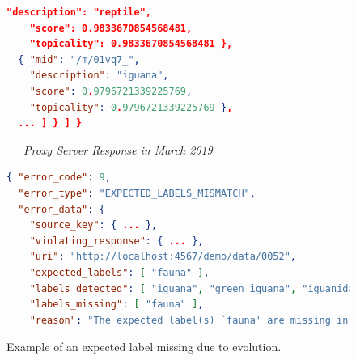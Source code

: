 \begin{figure}
\begin{framed}
\begin{minipage}{\linewidth}
\begin{lstlisting}[language=json]
    "description": "reptile",
    "score": 0.9833670854568481,
    "topicality": 0.9833670854568481 },
  { "mid": "/m/01vq7_",
    "description": "iguana",
    "score": 0.9796721339225769,
    "topicality": 0.9796721339225769 },
  ... ] } ] }
        \end{lstlisting}
    \end{minipage}
    \begin{minipage}{\linewidth}
        \noindent\xrfill[0.45ex]{.5pt}~~~\textit{Proxy Server Response in March 2019}~~~\xrfill[0.45ex]{.5pt}
        \begin{lstlisting}[language=json]
{ "error_code": 9,
  "error_type": "EXPECTED_LABELS_MISMATCH",
  "error_data": {
    "source_key": { ... },
    "violating_response": { ... },
    "uri": "http://localhost:4567/demo/data/0052",
    "expected_labels": [ "fauna" ],
    "labels_detected": [ "iguana", "green iguana", "iguanidae", "lizard", "scaled reptile", "marine iguana", "terrestrial animal", "organism" ],
    "labels_missing": [ "fauna" ],
    "reason": "The expected label(s) `fauna' are missing in the response." } }
        \end{lstlisting}
    \end{minipage}
    \end{framed}
    \caption[Architecture response of expected label mismatch]{Example of an expected label missing due to evolution.}
    \label{fig:example-expected-labels}
\end{figure}












